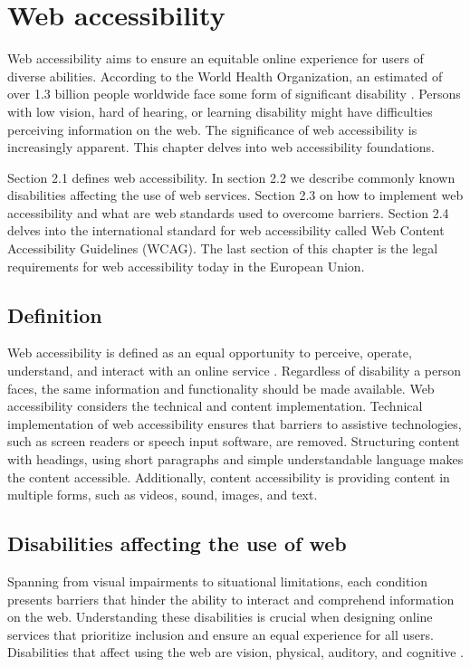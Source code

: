 \chapter{Web accessibility\label{accessibility}}

Web accessibility aims to ensure an equitable online experience for users of diverse abilities. According to the World Health Organization, an estimated of over 1.3 billion people worldwide face some form of significant disability \citep{whodisability}. Persons with low vision, hard of hearing, or learning disability might have difficulties perceiving information on the web. The significance of web accessibility is increasingly apparent. This chapter delves into web accessibility foundations. 

Section 2.1 defines web accessibility. In section 2.2 we describe commonly known disabilities affecting the use of web services. Section 2.3 on how to implement web accessibility and what are web standards used to overcome barriers. Section 2.4 delves into the international standard for web accessibility called Web Content Accessibility Guidelines (WCAG). The last section of this chapter is the legal requirements for web accessibility today in the European Union.

\section{Definition}

Web accessibility is defined as an equal opportunity to perceive, operate, understand, and interact with an online service \citep{webaccessibilitydefinition}. Regardless of disability a person faces, the same information and functionality should be made available. Web accessibility considers the technical and content implementation. Technical implementation of web accessibility ensures that barriers to assistive technologies, such as screen readers or speech input software, are removed. Structuring content with headings, using short paragraphs and simple understandable language makes the content accessible. Additionally, content accessibility is providing content in multiple forms, such as videos, sound, images, and text.

\section{Disabilities affecting the use of web}

Spanning from visual impairments to situational limitations, each condition presents barriers that hinder the ability to interact and comprehend information on the web. Understanding these disabilities is crucial when designing online services that prioritize inclusion and ensure an equal experience for all users. Disabilities that affect using the web are vision, physical, auditory, and cognitive \citep{w3cbarriers}.

